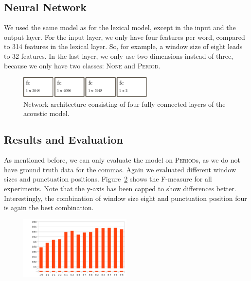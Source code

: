 \subsection{Neural Network}

We used the same model as for the lexical model, except in the input and the output layer.
For the input layer, we only have four features per word, compared to 314 features in the lexical layer.
So, for example, a window size of eight leads to 32 features.
In the last layer, we only use two dimensions instead of three, because we only have two classes: \textsc{None} and \textsc{Period}.

\begin{figure}[ht]
    \centering
    \includegraphics[width=0.6\textwidth]{img/net_acoustic.pdf}
    \caption{Network architecture consisting of four fully connected layers of the acoustic model.}
    \label{fig:net_acoustic}
\end{figure}


\subsection{Results and Evaluation}

As mentioned before, we can only evaluate the model on \textsc{Period}s, as we do not have ground truth data for the commas.
Again we evaluated different window sizes and punctuation positions.
Figure~\ref{audio_eval} shows the F-measure for all experiments.
Note that the y-axis has been capped to show differences better.
Interestingly, the combination of window size eight and punctuation position four is again the best combination.

\begin{figure}[ht]
    \centering
    \includegraphics[width=0.5\textwidth]{img/audio_parameter_eval.png}
    \caption{}
    \label{audio_eval}
\end{figure}

